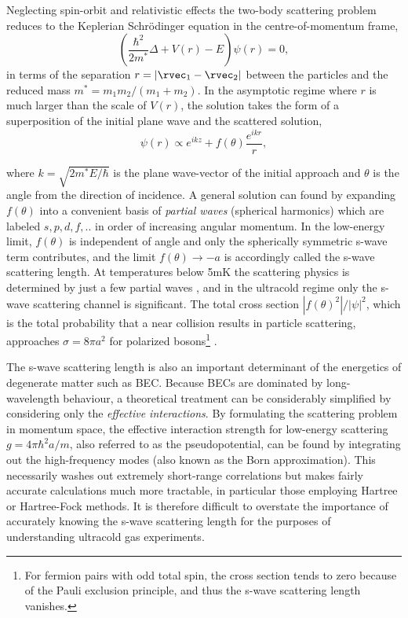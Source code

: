 	Neglecting spin-orbit and relativistic effects the two-body scattering problem reduces to the Keplerian Schr\"{o}dinger equation in the centre-of-momentum frame,
	\begin{equation}
	\left(\frac{\hbar^2}{2m^*}\Delta + V(r) - E\right)\psi(r) = 0,
	\end{equation}
	in terms of the separation $r=|\rvec_1-\rvec_2|$ between the particles and the reduced mass $m^*=m_1m_2/(m_1+m_2)$. In the asymptotic regime where $r$ is much larger than the scale of $V(r)$, the solution takes the form of a superposition of the initial plane wave and the scattered solution,
	\begin{equation}
	\psi(r) \propto e^{ikz} + f(\theta)\frac{e^{ikr}}{r},
	\end{equation}

	where $k=\sqrt{2m^*E/\hbar}$ is the plane wave-vector of the initial approach and $\theta$ is the angle from the direction of incidence. A general solution can found by expanding $f(\theta)$ into a convenient basis of \emph{partial waves} (spherical harmonics) which are labeled $s,p,d,f,..$ in order of increasing angular momentum. In the low-energy limit, $f(\theta)$ is independent of angle and only the spherically symmetric s-wave term contributes, and the limit $f(\theta)\rightarrow-a$ is accordingly called the s-wave scattering length. At temperatures below 5mK  the scattering physics is determined by just a few partial waves \cite{mcnamara07}, and in the ultracold regime only the s-wave scattering channel is significant. The total cross section $|f(\theta)^2|/|\psi|^2$, which is the total probability that a near collision results in particle scattering, approaches $\sigma=8\pi a^2$ for polarized bosons\footnote{For fermion pairs with odd total spin, the cross section tends to zero because of the Pauli exclusion principle, and thus the s-wave scattering length vanishes.} \cite{przybytek05}. 

	The s-wave scattering length is also an important determinant of the energetics of degenerate matter such as BEC. Because BECs are dominated by long-wavelength behaviour, a theoretical treatment can be considerably simplified by considering only the \emph{effective interactions}. By formulating the scattering problem in momentum space, the effective interaction strength for low-energy scattering  $g=4\pi \hbar^2 a/m$, also referred to as the pseudopotential, can be found by integrating out the high-frequency modes (also known as the Born approximation). This necessarily washes out extremely short-range correlations but makes fairly accurate calculations much more tractable, in particular those employing Hartree or Hartree-Fock methods. It is therefore difficult to overstate the importance of accurately knowing the s-wave scattering length for the purposes of understanding ultracold gas experiments. 

